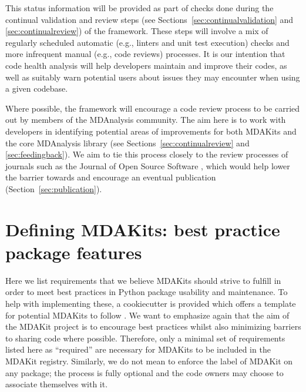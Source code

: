\documentclass[9pt,whitepaper]{livecoms}
\begin{document}
This status information will be provided as part of checks done during the continual validation and review steps (see Sections~\ref{sec:continualvalidation} and \ref{sec:continualreview}) of the framework. These steps will involve a mix of regularly scheduled automatic (e.g., linters and unit test execution) checks and more infrequent manual (e.g., code reviews) processes. It is our intention that code health analysis will help developers maintain and improve their codes, as well as suitably warn potential users about issues they may encounter when using a given codebase.

Where possible, the framework will encourage a code review process to be carried out by members of the MDAnalysis community. The aim here is to work with developers in identifying potential areas of improvements for both MDAKits and the core MDAnalysis library (see Sections~\ref{sec:continualreview} and \ref{sec:feedingback}). We aim to tie this process closely to the review processes of journals such as the Journal of Open Source Software \cite{noauthor_journal_nodate}, which would help lower the barrier towards and encourage an eventual publication (Section~\ref{sec:publication}).

\section{Defining MDAKits: best practice package features}
\label{sec:definitions}

Here we list requirements that we believe MDAKits should strive to fulfill in order to meet best practices in Python package usability and maintenance. To help with implementing these, a cookiecutter is provided which offers a template for potential MDAKits to follow \cite{wang_cookiecutter_nodate}. We want to emphasize again that the aim of the MDAKit project is to encourage best practices whilst also minimizing barriers to sharing code where possible. Therefore, only a minimal set of requirements listed here as “required” are necessary for MDAKits to be included in the MDAKit registry. Similarly, we do not mean to enforce the label of MDAKit on any package; the process is fully optional and the code owners may choose to associate themselves with it.
\end{document}
